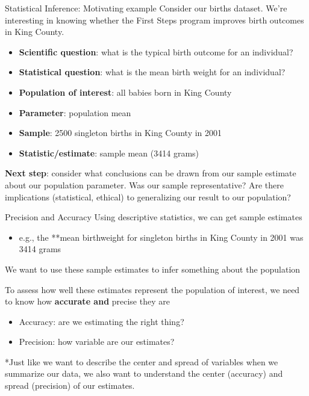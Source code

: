 \documentclass[
  ignorenonframetext,
]{beamer}
\providecommand{\tightlist}{%
  \setlength{\itemsep}{0pt}\setlength{\parskip}{0pt}}
\begin{document}
\begin{frame}{Statistical Inference: Motivating example}
\protect\hypertarget{statistical-inference-motivating-example-6}{}
Consider our births dataset. We're interesting in knowing whether the
First Steps program improves birth outcomes in King County.

\begin{itemize}
\item
  \textbf{Scientific question}: what is the {typical} {birth outcome}
  for an individual?
\item
  \textbf{Statistical question}: what is the {mean} {birth weight} for
  an individual?
\item
  \textbf{Population of interest}: all babies born in King County
\item
  \textbf{Parameter}: population mean
\item
  \textbf{Sample}: 2500 singleton births in King County in 2001
\item
  \textbf{Statistic/estimate}: sample mean (3414 grams)
\end{itemize}

\textbf{Next step}: consider what conclusions can be drawn from our
sample estimate about our population parameter. Was our sample
representative? Are there implications (statistical, ethical) to
generalizing our result to our population?
\end{frame}

\begin{frame}{Precision and Accuracy}
\protect\hypertarget{precision-and-accuracy}{}
Using descriptive statistics, we can get sample estimates

\begin{itemize}
\tightlist
\item
  e.g., the **mean birthweight for singleton births in King County in
  2001 was 3414 grams
\end{itemize}

We want to use these sample estimates to infer something about the
population

To assess how well these estimates represent the population of interest,
we need to know how \textbf{accurate and }precise they are

\begin{itemize}
\tightlist
\item
  Accuracy: are we estimating the right thing?
\item
  Precision: how variable are our estimates?
\end{itemize}

*Just like we want to describe the center and spread of variables when
we summarize our data, we also want to understand the center (accuracy)
and spread (precision) of our estimates.
\end{frame}
\end{document}
